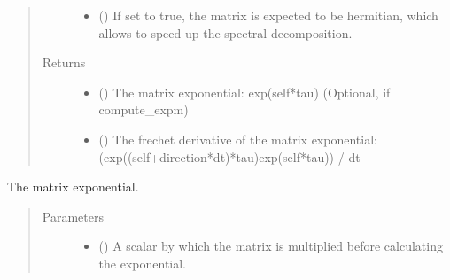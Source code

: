 \documentclass[letterpaper,10pt,english]{sphinxmanual}
\begin{document}
\begin{fulllineitems}
\begin{fulllineitems}
\begin{quote}
\begin{description}
\begin{itemize}
\item {} 
 () \textendash{} If set to true, the matrix is expected to be hermitian, which
allows to speed up the spectral decomposition.

\end{itemize}

\item[{Returns}] \leavevmode
\begin{itemize}
\item {} 
 () \textendash{} The matrix exponential: exp(self*tau) (Optional, if compute\_expm)

\item {} 
 () \textendash{} The frechet derivative of the matrix exponential:
(exp((self+direction*dt)*tau)\sphinxhyphen{}exp(self*tau)) / dt

\end{itemize}


\end{description}\end{quote}

\end{fulllineitems}


\begin{fulllineitems}
\label{\detokenize{qsim:qsim.matrix.OperatorMatrix.exp}}
The matrix exponential.
\begin{quote}\begin{description}
\item[{Parameters}] \leavevmode\begin{itemize}
\item {} 
 (\sphinxstyleliteralemphasis{\sphinxupquote{, }}) \textendash{} A scalar by which the matrix is multiplied before calculating the
exponential.


\end{itemize}
\end{description}
\end{quote}
\end{fulllineitems}
\end{fulllineitems}
\end{document}
